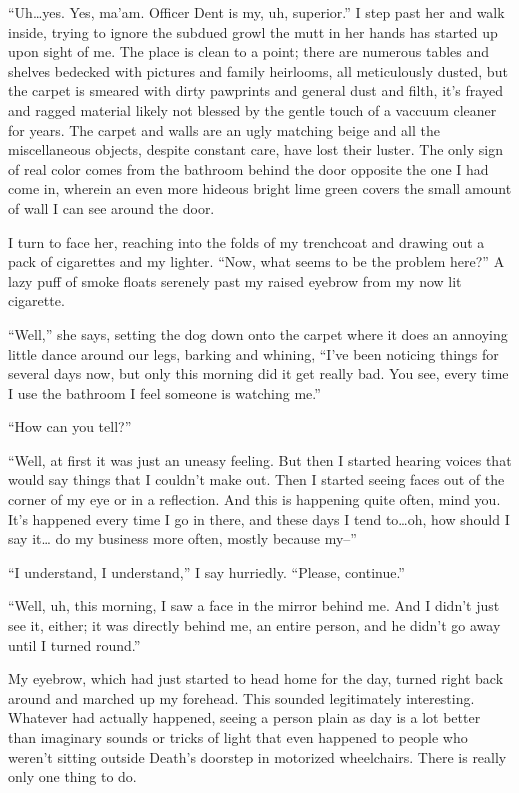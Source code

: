 ``Uh\ldots yes. Yes, ma'am. Officer Dent is my, uh, superior.'' I step past
her and walk inside, trying to ignore the subdued growl the mutt in her
hands has started up upon sight of me. The place is clean to a point;
there are numerous tables and shelves bedecked with pictures and family
heirlooms, all meticulously dusted, but the carpet is smeared with dirty
pawprints and general dust and filth, it's frayed and ragged material
likely not blessed by the gentle touch of a vaccuum cleaner for
years. The carpet and walls are an ugly matching beige and all the
miscellaneous objects, despite constant care, have lost their
luster. The only sign of real color comes from the bathroom behind the
door opposite the one I had come in, wherein an even more hideous bright
lime green covers the small amount of wall I can see around the door.

I turn to face her, reaching into the folds of my trenchcoat and drawing
out a pack of cigarettes and my lighter. ``Now, what seems to be the
problem here?'' A lazy puff of smoke floats serenely past my raised
eyebrow from my now lit cigarette.

``Well,'' she says, setting the dog down onto the carpet where it does an
annoying little dance around our legs, barking and whining, ``I've been
noticing things for several days now, but only this morning did it get
really bad. You see, every time I use the bathroom I feel someone is
watching me.''

``How can you tell?''

``Well, at first it was just an uneasy feeling. But then I started
hearing voices that would say things that I couldn't make out. Then I
started seeing faces out of the corner of my eye or in a reflection. And
this is happening quite often, mind you. It's happened every time I go
in there, and these days I tend to\ldots oh, how should I say it\ldots
do my business more often, mostly because my--''

``I understand, I understand,'' I say hurriedly. ``Please, continue.''

``Well, uh, this morning, I saw a face in the mirror behind me. And I
didn't just see it, either; it was directly behind me, an entire person,
and he didn't go away until I turned round.''

My eyebrow, which had just started to head home for the day, turned
right back around and marched up my forehead. This sounded legitimately
interesting. Whatever had actually happened, seeing a person plain as
day is a lot better than imaginary sounds or tricks of light that even
happened to people who weren't sitting outside Death's doorstep in
motorized wheelchairs. There is really only one thing to do.

